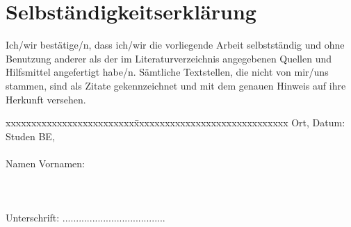 \chapter*{Selbständigkeitserklärung}
\label{chap:selbstaendigkeitserklaerung}

\vspace*{10mm} 

Ich/wir bestätige/n, dass ich/wir die vorliegende Arbeit selbstständig und ohne Benutzung anderer als der im Literaturverzeichnis angegebenen Quellen und Hilfsmittel angefertigt habe/n. Sämtliche Textstellen, die nicht von mir/uns stammen, sind als Zitate gekennzeichnet und mit dem genauen Hinweis auf ihre Herkunft versehen. 

\vspace{15mm}

\begin{tabbing}
xxxxxxxxxxxxxxxxxxxxxxxxx\=xxxxxxxxxxxxxxxxxxxxxxxxxxxxxx\kill
Ort, Datum:		 \> Studen BE, \versiondate \\ \\ 
Namen Vornamen:	\> \autor \\ \\ \\ \\ 
Unterschrift:	\> ...................................... \\
\end{tabbing}
